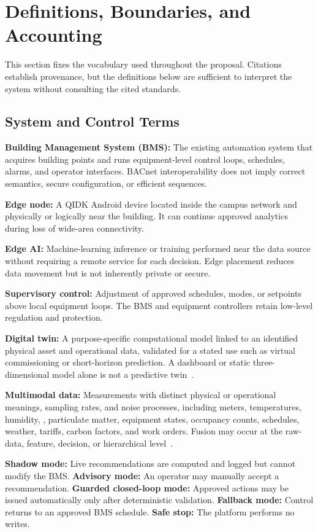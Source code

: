 \section{Definitions, Boundaries, and Accounting}

This section fixes the vocabulary used throughout the proposal. Citations establish provenance, but the definitions below are sufficient to interpret the system without consulting the cited standards.

\subsection{System and Control Terms}

\textbf{Building Management System (BMS):} The existing automation system that acquires building points and runs equipment-level control loops, schedules, alarms, and operator interfaces. BACnet interoperability does not imply correct semantics, secure configuration, or efficient sequences.

\textbf{Edge node:} A QIDK Android device located inside the campus network and physically or logically near the building. It can continue approved analytics during loss of wide-area connectivity.

\textbf{Edge AI:} Machine-learning inference or training performed near the data source without requiring a remote service for each decision. Edge placement reduces data movement but is not inherently private or secure.

\textbf{Supervisory control:} Adjustment of approved schedules, modes, or setpoints above local equipment loops. The BMS and equipment controllers retain low-level regulation and protection.

\textbf{Digital twin:} A purpose-specific computational model linked to an identified physical asset and operational data, validated for a stated use such as virtual commissioning or short-horizon prediction. A dashboard or static three-dimensional model alone is not a predictive twin~\cite{fuller2020digital}.

\textbf{Multimodal data:} Measurements with distinct physical or operational meanings, sampling rates, and noise processes, including meters, temperatures, humidity, \COtwo{}, particulate matter, equipment states, occupancy counts, schedules, weather, tariffs, carbon factors, and work orders. Fusion may occur at the raw-data, feature, decision, or hierarchical level~\cite{baltrusaitis2018multimodal}.

\textbf{Shadow mode:} Live recommendations are computed and logged but cannot modify the BMS. \textbf{Advisory mode:} An operator may manually accept a recommendation. \textbf{Guarded closed-loop mode:} Approved actions may be issued automatically only after deterministic validation. \textbf{Fallback mode:} Control returns to an approved BMS schedule. \textbf{Safe stop:} The platform performs no writes.

